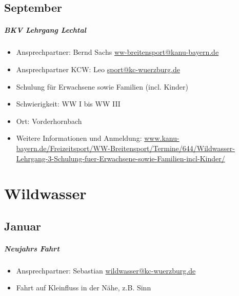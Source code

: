 \documentclass[12pt, a4paper]{report}
\begin{document}
\section*{September}\paragraph{BKV Lehrgang Lechtal}
\begin{itemize}
    \item Ansprechpartner: Bernd Sachs \href{mailto:ww-breitensport@kanu-bayern.de}{ww-breitensport@kanu-bayern.de}
    \item Ansprechpartner KCW: Leo \href{mailto:sport@kc-wuerzburg.de}{sport@kc-wuerzburg.de}
    \item Schulung für Erwachsene sowie Familien (incl. Kinder)
    \item Schwierigkeit: WW I bis WW III
    \item Ort: Vorderhornbach
    \item Weitere Informationen und Anmeldung: \url{www.kanu-bayern.de/Freizeitsport/WW-Breitensport/Termine/644/Wildwasser-Lehrgang-3-Schulung-fuer-Erwachsene-sowie-Familien-incl-Kinder/}
\end{itemize}


\chapter*{Wildwasser}
\thispagestyle{Wildwasser}
\pagestyle{Wildwasser}
\section*{Januar}\paragraph{Neujahrs Fahrt}
\begin{itemize}
    \item Ansprechpartner: Sebastian \href{mailto:wildwasser@kc-wuerzburg.de}{wildwasser@kc-wuerzburg.de}
    \item Fahrt auf Kleinfluss in der Nähe, z.B. Sinn 
\end{itemize}
\end{document}
